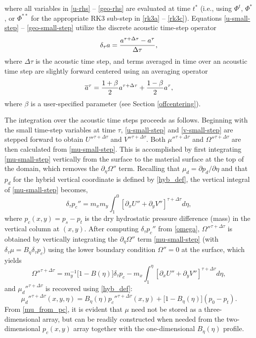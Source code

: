 %
\noindent
where all variables in \eqref{u-rhs} -- \eqref{geo-rhs} are evaluated at
time $t^*$ (i.e., using $\Phi^t$, $\Phi^*$, or $\Phi^{**}$ for the
appropriate RK3 sub-step in \eqref{rk3a} -- \eqref{rk3c}).  
Equations \eqref{u-small-step} -- \eqref{geo-small-step} utilize
the discrete
acoustic time-step operator
%
\begin{equation}
\delta_\tau a = { a^{\tau + \Delta \tau} - a^\tau \over \Delta \tau },
\notag
\end{equation}
%
\noindent
where $\Delta \tau$ is the acoustic time step, 
and terms averaged in time over an acoustic time step are slightly forward centered
using an averaging operator 
%
\begin{equation}
\overline{a}^\tau = {1 + \beta \over 2}a^{\tau+\Delta \tau} +
{1 - \beta \over 2}a^{\tau},
\label{avg-operator}
\end{equation}
%
\noindent
where $\beta$ is a user-specified parameter (see Section \ref{offcentering}).

The integration over the acoustic time steps proceeds as follows.
Beginning with the small time-step variables at time $\tau$, 
\eqref{u-small-step}
and \eqref{v-small-step}
are stepped forward to obtain ${U''}^{\tau+\Delta\tau}$ and
${V''}^{\tau+\Delta\tau}$. Both ${\mu''}^{\tau+\Delta\tau}$ and
${\Omega''}^{\tau+\Delta\tau}$ are then calculated from
\eqref{mu-small-step}. 
This is
accomplished by first integrating \eqref{mu-small-step} 
vertically from the surface to the
material surface at the top of the domain, which removes the $\partial_\eta
\Omega''$ term. Recalling that $\mu_d=\partial p_d/\partial\eta$ and that $p_d$
for the hybrid vertical coordinate is defined by \eqref{hyb_def}, the vertical 
integral of \eqref{mu-small-step} becomes,
%
\begin{equation}
  \delta_\tau{p_c}'' = m_x m_y \int_1^0 
 [\partial_x U'' + \partial_y V'']^{\tau+\Delta \tau} 
d\eta,
\label{omega}
\end{equation}
%
where $p_c(x,y)=p_s-p_t$ is the dry hydrostatic pressure difference (mass) in the
vertical column at $(x,y)$.
After computing $\delta_\tau{p_c''}$ from \eqref{omega},
${\Omega''}^{\tau+\Delta\tau}$ is obtained by vertically integrating the
$\partial_\eta \Omega''$ term \eqref{mu-small-step} (with $\delta_\tau\mu=B_\eta\delta _\tau p_c$) using the lower boundary 
condition $\Omega''=0$ at the
surface, which yields
\begin{equation}
{\Omega''}^{\tau+\Delta\tau} = m_y^{-1}\bigl[1-B(\eta)\bigr]\delta_\tau p_c- m_x\int_1^\eta 
 [\partial_x U'' + \partial_y V'']^{\tau+\Delta \tau} 
d\eta,
\label{omega_int}
\end{equation}
%
and $\mu_d''^{\tau+\Delta\tau}$ is recovered using \eqref{hyb_def}: 
\begin{equation}
{\mu_d''}^{\tau+\Delta\tau}(x,y,\eta) = B_\eta(\eta){p_c''}^{\tau+\Delta\tau}(x,y)+\bigl[1-B_\eta(\eta)\bigr](p_0-p_t).
\label{mu_from_pc}
\end{equation}
%
From \eqref{mu_from_pc}, it is evident that $\mu$ need not be stored as a three-dimensional array, but can be readily constructed when needed from the two-dimensional $p_c(x,y)$ array together with the one-dimensional $B_\eta(\eta)$ profile.

